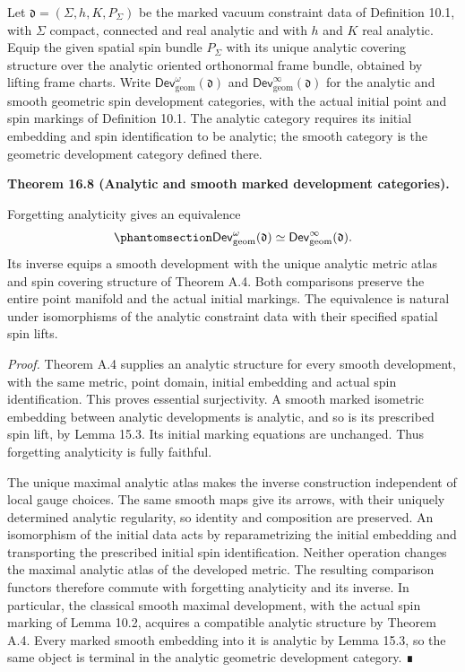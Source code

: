 \documentclass[
  english,
  11pt,
  reqno]{amsart}
\makeatletter
\newcommand{\pandocstatementheading}[1]{%
  \par\if@nobreak\else
    \addpenalty{\@beginparpenalty}%
    \addvspace{.5\baselineskip plus .2\baselineskip minus .2\baselineskip}%
  \fi
  {\normalfont\bfseries #1\par}%
  \nobreak\@afterindenttrue\@afterheading
}
\makeatother
\begin{document}
Let \(\mathfrak d=(\Sigma,h,K,P_\Sigma)\) be the marked vacuum
constraint data of Definition 10.1, with \(\Sigma\) compact, connected
and real analytic and with \(h\) and \(K\) real analytic. Equip the
given spatial spin bundle \(P_\Sigma\) with its unique analytic covering
structure over the analytic oriented orthonormal frame bundle, obtained
by lifting frame charts. Write
\(\mathsf{Dev}^{\omega}_{\mathrm{geom}}(\mathfrak d)\) and
\(\mathsf{Dev}^{\infty}_{\mathrm{geom}}(\mathfrak d)\) for the analytic
and smooth geometric spin development categories, with the actual
initial point and spin markings of Definition 10.1. The analytic
category requires its initial embedding and spin identification to be
analytic; the smooth category is the geometric development category
defined there.

\pandocstatementheading{\protect{}\label{thm:analytic-smooth-marked-development-equivalence}Theorem 16.8 (Analytic and smooth marked development categories).}

Forgetting analyticity gives an equivalence
\begin{equation}\protect\phantomsection\label{eq:analytic-smooth-marked-development-equivalence}{
\mathsf{Dev}^{\omega}_{\mathrm{geom}}(\mathfrak d)
\simeq
\mathsf{Dev}^{\infty}_{\mathrm{geom}}(\mathfrak d).
}\end{equation} Its inverse equips a smooth development with the unique
analytic metric atlas and spin covering structure of Theorem A.4. Both
comparisons preserve the entire point manifold and the actual initial
markings. The equivalence is natural under isomorphisms of the analytic
constraint data with their specified spatial spin lifts.

\emph{Proof.} Theorem A.4 supplies an analytic structure for every
smooth development, with the same metric, point domain, initial
embedding and actual spin identification. This proves essential
surjectivity. A smooth marked isometric embedding between analytic
developments is analytic, and so is its prescribed spin lift, by Lemma
15.3. Its initial marking equations are unchanged. Thus forgetting
analyticity is fully faithful.

The unique maximal analytic atlas makes the inverse construction
independent of local gauge choices. The same smooth maps give its
arrows, with their uniquely determined analytic regularity, so identity
and composition are preserved. An isomorphism of the initial data acts
by reparametrizing the initial embedding and transporting the prescribed
initial spin identification. Neither operation changes the maximal
analytic atlas of the developed metric. The resulting comparison
functors therefore commute with forgetting analyticity and its inverse.
In particular, the classical smooth maximal development, with the actual
spin marking of Lemma 10.2, acquires a compatible analytic structure by
Theorem A.4. Every marked smooth embedding into it is analytic by Lemma
15.3, so the same object is terminal in the analytic geometric
development category. ∎
\end{document}

